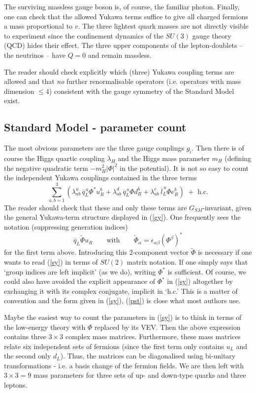 \documentclass[12pt]{article}
\newcommand{\be}{\begin{equation}}
\newcommand{\ee}{\end{equation}}
\newcommand{\ol}{\overline}
\numberwithin{equation}{section}
\begin{document}
The surviving massless gauge boson is, of course, the familiar photon. 
Finally, one can check that the allowed Yukawa terms suffice to give all charged fermions a mass proportional to $v$. The three lightest quark masses are not directly visible to experiment since the confinement dynamics of the $SU(3)$ gauge theory (QCD) hides their effect. The three upper components of the lepton-doublets -- the neutrinos -- have $Q=0$ and remain massless. 

The reader should check explicitly which (three) Yukawa coupling terms are allowed and that {\it no} further renormalisable operators (i.e. operators with mass dimension $\leq 4$) consistent with the gauge symmetry of the Standard Model exist.





\subsection{Standard Model - parameter count}
The most obvious parameters are the three gauge couplings $g_i$. Then there is of course the Higgs quartic coupling $\lambda_H$ and the Higgs mass parameter $m_H$ (defining the negative quadratic term $-m_H^2|\Phi|^2$ in the potential). It is not so easy to count the independent Yukawa couplings contained in the three terms 
\be
\sum_{a,b=1}^3\left(\lambda^u_{ab}\,\ol{q}_L^{\,a}\Phi^* u_R^b+
\lambda^d_{ab}\,\ol{q}_L^{\,a} \Phi d_R^b+ \lambda^e_{ab}\,\ol{l}_L^{\,a} \Phi e_R^b \right)\,\,+\,\,\mbox{h.c.}\label{sy}
\ee
The reader should check that these and only these terms are $G_{SM}$-invariant, given the general Yukawa-term structure displayed in (\ref{gy}). One frequently sees the notation (suppressing generation indices)
\be
\ol{q}_L\tilde{\Phi}u_R \qquad\mbox{with}\qquad \tilde{\Phi}_\alpha=\epsilon_{\alpha\beta}(\Phi^\beta)^* \label{pst}
\ee
for the first term above. Introducing this 2-component vector $\tilde{\Phi}$ is necessary if one wants to read (\ref{sy}) in terms of $SU(2)$ matrix notation. If one simply says that `group indices are left implicit' (as we do), writing $\Phi^*$ is sufficient. Of course, we could also have avoided the explicit appearance of $\Phi^*$ in (\ref{sy}) altogether by exchanging it with its complex conjugate, implicit in `h.c.' This is a matter of convention and the form given in (\ref{sy}), (\ref{pst}) is close what most authors use.

Maybe the easiest way to count the parameters in (\ref{sy}) is to think in terms of the low-energy theory with $\Phi$ replaced by its VEV. Then the above expression contains three $3\!\times\!3$ complex mass matrices. Furthermore, these mass matrices relate six independent sets of fermions (since the first term only contains $u_L$ and the second only $d_L$). Thus, the matrices can be diagonalised using bi-unitary transformations - i.e. a basis change of the fermion fields. We are then left with $3\!\times\! 3=9$ mass parameters for three sets of up- and down-type quarks and three leptons. 
\end{document}
